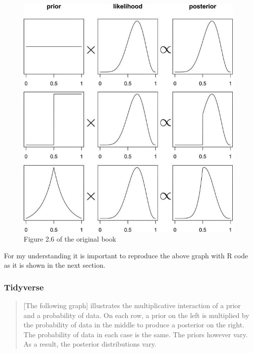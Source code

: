 \documentclass[
  letterpaper,
  DIV=11,
  numbers=noendperiod]{scrreprt}
\begin{document}
\begin{figure}

{\centering \includegraphics{img/SR2-fig2_6-min.jpg}

}

\caption{\label{fig-2-6-book}Figure 2.6 of the original book}

\end{figure}

For my understanding it is important to reproduce the above graph with R
code as it is shown in the next section.

\hypertarget{tidyverse-4}{%
\subsubsection{Tidyverse}\label{tidyverse-4}}

\begin{quote}
{[}The following graph{]} illustrates the multiplicative interaction of
a prior and a probability of data. On each row, a prior on the left is
multiplied by the probability of data in the middle to produce a
posterior on the right. The probability of data in each case is the
same. The priors however vary. As a result, the posterior distributions
vary.
\end{quote}
\end{document}
